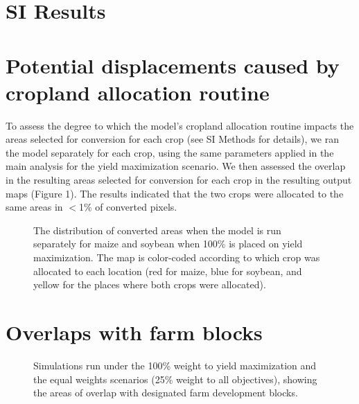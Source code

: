 \documentclass[a4paper]{article}
\begin{document}
\section*{\Large SI Results}

\section*{\large Potential displacements caused by cropland allocation routine}
To assess the degree to which the model's cropland allocation routine impacts the areas selected for conversion for each crop (see SI Methods for details), we ran the model separately for each crop, using the same parameters applied in the main analysis for the yield maximization scenario. We then assessed the overlap in the resulting areas selected for conversion for each crop in the resulting output maps (Figure 1). The results indicated that the two crops were allocated to the same areas in $<$1\% of converted pixels. 

\begin{figure}[!ht]
\captionsetup{width=0.95\linewidth, font=small}
       \begin{center}
        \end{center}
      \caption{The distribution of converted areas when the model is run separately for maize and soybean when 100\% is placed on yield maximization. The map is color-coded according to which crop was allocated to each location (red for maize, blue for soybean, and yellow for the places where both crops were allocated).}
      \label{fig:default}
\end{figure}

\section*{\large Overlaps with farm blocks}

\begin{figure}[!ht]
\captionsetup{width=0.95\linewidth, font=small}
       \begin{center}
        \end{center}
      \caption{Simulations run under the 100\% weight to yield maximization and the equal weights scenarios (25\% weight to all objectives), showing the areas of overlap with designated farm development blocks. }
      \label{fig:default}
\end{figure}
\end{document}
